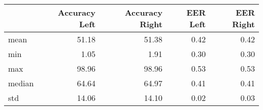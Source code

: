 \begin{tabular}{lrrrr}
\toprule
{} &  Accuracy Left &  Accuracy Right &  EER Left &  EER Right \\
\midrule
mean   &          51.18 &           51.38 &      0.42 &       0.42 \\
min    &           1.05 &            1.91 &      0.30 &       0.30 \\
max    &          98.96 &           98.96 &      0.53 &       0.53 \\
median &          64.64 &           64.97 &      0.41 &       0.41 \\
std    &          14.06 &           14.10 &      0.02 &       0.03 \\
\bottomrule
\end{tabular}
